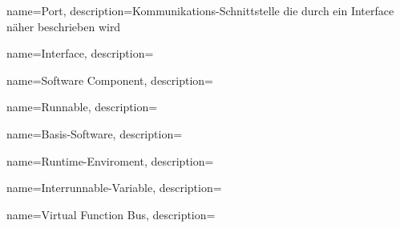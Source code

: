  {
   name=Port,
   description={Kommunikations-Schnittstelle die durch ein Interface näher beschrieben wird}
}

 {
   name=Interface,
   description={}
}

 {
   name=Software Component,
   description={}
}

 {
   name=Runnable,
   description={}
}

 {
   name=Basis-Software,
   description={}
}

 {
   name=Runtime-Enviroment,
   description={}
}

 {
   name=Interrunnable-Variable,
   description={}
}

 {
   name=Virtual Function Bus,
   description={}
}
